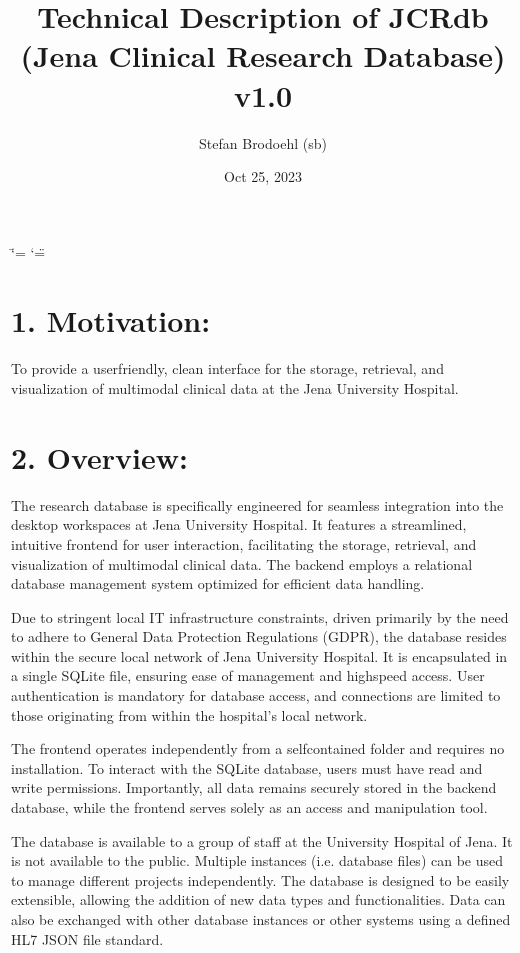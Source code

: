 \documentclass[a4paper,10pt,english]{sphinxmanual}
\title{Technical Description of JCRdb (Jena Clinical Research Database) v1.0}
\date{Oct 25, 2023}
\author{Stefan Brodoehl (sb)}
\begin{document}
\ifdefined\shorthandoff
  \ifnum\catcode`\=\string=\active\shorthandoff{=}\fi
  \ifnum\catcode`\"=\active{}\fi
\fi

\pagestyle{empty}
\sphinxmaketitle
\pagestyle{plain}
\sphinxtableofcontents
\pagestyle{normal}
\label{\detokenize{index::doc}}
\sphinxstepscope




\chapter{1. Motivation:}
\label{\detokenize{TechnicalDetails:motivation}}
\sphinxAtStartPar
To provide a user\sphinxhyphen{}friendly, clean interface for the storage, retrieval, and visualization of multimodal clinical data at the Jena University Hospital.


\chapter{2. Overview:}
\label{\detokenize{TechnicalDetails:overview}}
\sphinxAtStartPar
The research database is specifically engineered for seamless integration into the desktop workspaces at Jena University Hospital. It features a streamlined, intuitive frontend for user interaction, facilitating the storage, retrieval, and visualization of multimodal clinical data. The backend employs a relational database management system optimized for efficient data handling.

\sphinxAtStartPar
Due to stringent local IT infrastructure constraints, driven primarily by the need to adhere to General Data Protection Regulations (GDPR), the database resides within the secure local network of Jena University Hospital. It is encapsulated in a single SQLite file, ensuring ease of management and high\sphinxhyphen{}speed access. User authentication is mandatory for database access, and connections are limited to those originating from within the hospital’s local network.

\sphinxAtStartPar
The frontend operates independently from a self\sphinxhyphen{}contained folder and requires no installation. To interact with the SQLite database, users must have read and write permissions. Importantly, all data remains securely stored in the backend database, while the frontend serves solely as an access and manipulation tool.

\sphinxAtStartPar
The database is available to a group of staff at the University Hospital of Jena. It is not available to the public. Multiple instances (i.e. database files) can be used to manage different projects independently. The database is designed to be easily extensible, allowing the addition of new data types and functionalities. Data can also be exchanged with other database instances or other systems using a defined HL7 JSON file standard.
\end{document}
